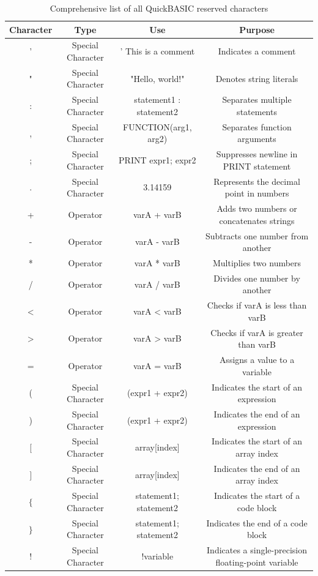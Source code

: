 \documentclass[10pt, reqno]{exam}
\begin{document}
\begin{table}[h]
    \centering
    \caption{Comprehensive list of all QuickBASIC reserved characters}
    \label{tbl:reserved characters}
    \begin{tabular}{|c|c|c|c|}
    \hline
    Character & Type & Use & Purpose \\
    \hline
    ' & Special Character & ' This is a comment & Indicates a comment \\
    " & Special Character & "Hello, world!" & Denotes string literals \\
    : & Special Character & statement1 : statement2 & Separates multiple statements \\
    , & Special Character & FUNCTION(arg1, arg2) & Separates function arguments \\
    ; & Special Character & PRINT expr1; expr2 & Suppresses newline in PRINT statement \\
    . & Special Character & 3.14159 & Represents the decimal point in numbers \\
    + & Operator & varA + varB & Adds two numbers or concatenates strings \\
    - & Operator & varA - varB & Subtracts one number from another \\
    * & Operator & varA * varB & Multiplies two numbers \\
    / & Operator & varA / varB & Divides one number by another \\
    < & Operator & varA < varB & Checks if varA is less than varB \\
    > & Operator & varA > varB & Checks if varA is greater than varB \\
    = & Operator & varA = varB & Assigns a value to a variable \\
    ( & Special Character & (expr1 + expr2) & Indicates the start of an expression \\
    ) & Special Character & (expr1 + expr2) & Indicates the end of an expression \\
    $[$ & Special Character & array[index] & Indicates the start of an array index \\
    $]$ & Special Character & array[index] & Indicates the end of an array index \\
    $\{$ & Special Character & { statement1; statement2 } & Indicates the start of a code block \\
    $\}$ & Special Character & { statement1; statement2 } & Indicates the end of a code block \\
    ! & Special Character & !variable & Indicates a single-precision floating-point variable \\
    \hline
    \end{tabular}
\end{table}
\end{document}

